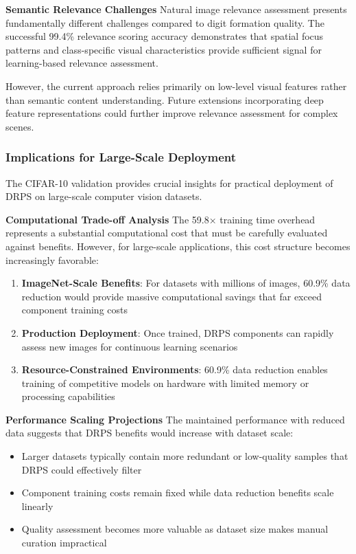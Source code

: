 \documentclass[12pt]{article}
\begin{document}
\textbf{Semantic Relevance Challenges}
Natural image relevance assessment presents fundamentally different challenges compared to digit formation quality. The successful 99.4\% relevance scoring accuracy demonstrates that spatial focus patterns and class-specific visual characteristics provide sufficient signal for learning-based relevance assessment.

However, the current approach relies primarily on low-level visual features rather than semantic content understanding. Future extensions incorporating deep feature representations could further improve relevance assessment for complex scenes.

\subsubsection{Implications for Large-Scale Deployment}\label{deployment-implications}

The CIFAR-10 validation provides crucial insights for practical deployment of DRPS on large-scale computer vision datasets.

\textbf{Computational Trade-off Analysis}
The 59.8× training time overhead represents a substantial computational cost that must be carefully evaluated against benefits. However, for large-scale applications, this cost structure becomes increasingly favorable:

\begin{enumerate}
\item \textbf{ImageNet-Scale Benefits}: For datasets with millions of images, 60.9\% data reduction would provide massive computational savings that far exceed component training costs
\item \textbf{Production Deployment}: Once trained, DRPS components can rapidly assess new images for continuous learning scenarios
\item \textbf{Resource-Constrained Environments}: 60.9\% data reduction enables training of competitive models on hardware with limited memory or processing capabilities
\end{enumerate}

\textbf{Performance Scaling Projections}
The maintained performance with reduced data suggests that DRPS benefits would increase with dataset scale:
\begin{itemize}
\item Larger datasets typically contain more redundant or low-quality samples that DRPS could effectively filter
\item Component training costs remain fixed while data reduction benefits scale linearly
\item Quality assessment becomes more valuable as dataset size makes manual curation impractical
\end{itemize}
\end{document}
